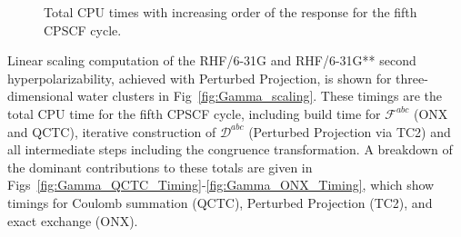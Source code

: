 \documentclass[prl,aps,letterpaper,twocolumn,showpacs,twocolumngrid,superbib]{revtex4}
\def\F{\mathcal{F}}
\def\D{\mathcal{D}}
\begin{document}
\begin{figure}[h]
  \caption{Total CPU times with increasing order of the response for 
           the fifth CPSCF cycle.}
\end{figure}

Linear scaling computation of the RHF/6-31G and RHF/6-31G** second hyperpolarizability,
achieved with Perturbed Projection, is shown for three-dimensional water clusters 
in Fig~\ref{fig:Gamma_scaling}.  These timings are the total CPU time for the fifth CPSCF cycle, 
including build time for $\F^{abc}$ ({\sc ONX} and {\sc QCTC}), 
iterative construction of $\D^{abc}$ (Perturbed Projection via {\sc TC2}) and all intermediate
steps including the congruence transformation.
A breakdown of the dominant contributions to these totals are given
in Figs~\ref{fig:Gamma_QCTC_Timing}-\ref{fig:Gamma_ONX_Timing}, which show timings for Coulomb 
summation ({\sc QCTC}), Perturbed Projection ({\sc TC2}), and exact exchange ({\sc ONX}).
\end{document}
